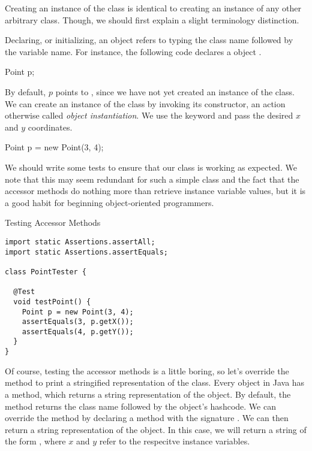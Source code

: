 Creating an instance of the  class is identical to creating an instance of any other arbitrary class. Though, we should first explain a slight terminology distinction.

Declaring, or initializing, an object refers to typing the class name followed by the variable name. For instance, the following code declares a  object .

\begin{verbnobox}[\small]
Point p;
\end{verbnobox}

By default, $p$ points to , since we have not yet created an instance of the  class. We can create an instance of the  class by invoking its constructor, an action otherwise called \textit{object instantiation}. We use the  keyword and pass the desired $x$ and $y$ coordinates. 

\begin{verbnobox}[\small]
Point p = new Point(3, 4);
\end{verbnobox}

We should write some tests to ensure that our  class is working as expected. We note that this may seem redundant for such a simple class and the fact that the accessor methods do nothing more than retrieve instance variable values, but it is a good habit for beginning object-oriented programmers.

\begin{cl}[]{Testing Accessor Methods}
\begin{lstlisting}[language=MyJava]
import static Assertions.assertAll;
import static Assertions.assertEquals;

class PointTester {
  
  @Test
  void testPoint() {
    Point p = new Point(3, 4);
    assertEquals(3, p.getX());
    assertEquals(4, p.getY());
  }
}
\end{lstlisting}
\end{cl}

Of course, testing the accessor methods is a little boring, so let's override the  method to print a stringified representation of the  class. Every object in Java has a  method, which returns a string representation of the object. By default, the  method returns the class name followed by the object's hashcode. We can override the  method by declaring a  method with the signature . We can then return a string representation of the object. In this case, we will return a string of the form , where $x$ and $y$ refer to the respecitve instance variables.

